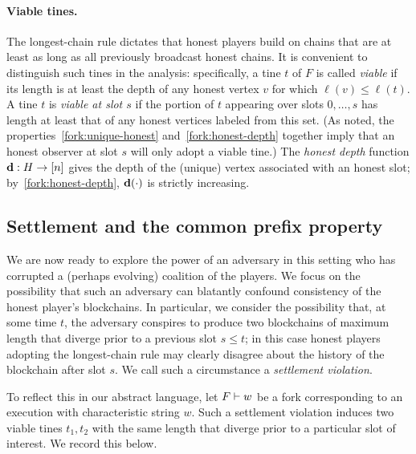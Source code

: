  \paragraph{Viable tines.}
 The longest-chain rule dictates that honest players build on chains
 that are at least as long as all previously broadcast honest
 chains. It is convenient to distinguish such tines in the analysis:
 specifically, a tine $t$ of $F$ is called \emph{viable} if its length
 is at least the depth of any honest vertex $v$ for which
 $\ell(v) \leq \ell(t)$. A tine $t$ is \emph{viable at slot $s$} if
 the portion of $t$ appearing over slots $0,\ldots, s$ has length at
 least that of any honest vertices labeled from this set. (As noted,
 the properties~\ref{fork:unique-honest} and~\ref{fork:honest-depth}
 together imply that an honest observer at slot $s$ will only adopt a
 viable tine.)  The \emph{honest depth} function
 $\mathbf{d} : H \rightarrow [n]$ gives the depth of the (unique) vertex
 associated with an honest slot; by~\ref{fork:honest-depth},
 $\mathbf{d}(\cdot)$ is strictly increasing.
  
  \subsection{Settlement and the common prefix
    property}\label{sec:cp-settlement}
  
  We are now ready to explore the power of an adversary in this
  setting who has corrupted a (perhaps evolving) coalition of the
  players. We focus on the possibility that such an adversary can
  blatantly confound consistency of the honest player's
  blockchains. In particular, we consider the possibility that, at
  some time $t$, the adversary conspires to produce two blockchains of
  maximum length that diverge prior to a previous slot $s \leq t$; in
  this case honest players adopting the longest-chain rule may clearly
  disagree about the history of the blockchain after slot $s$. We call
  such a circumstance a \emph{settlement violation}.

  To reflect this in our abstract language, let $F \vdash w$ be a fork
  corresponding to an execution with characteristic string $w$. Such a
  settlement violation induces two viable tines $t_1, t_2$ with the
  same length that diverge prior to a particular slot of interest. We
  record this below.
  
